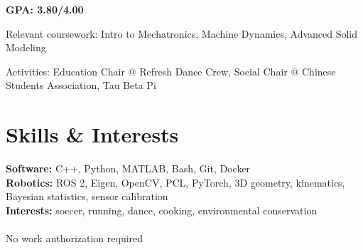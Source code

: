 \documentclass{resume}
\begin{document}
\begin{details}
\item \textbf{GPA: 3.80/4.00}
\item Relevant coursework: Intro to Mechatronics, Machine Dynamics, Advanced Solid Modeling
\item Activities: Education Chair @ Refresh Dance Crew, Social Chair @ Chinese Students
  Association, Tau Beta Pi
\end{details}

\section{Skills \& Interests}
\textbf{Software:} C++, Python, MATLAB, Bash, Git, Docker \\
\textbf{Robotics:} ROS 2, Eigen, OpenCV, PCL, PyTorch, 3D geometry, kinematics, Bayesian
statistics, sensor calibration \\
\textbf{Interests:} soccer, running, dance, cooking, environmental conservation \\~\\
\textsuperscript{\textasteriskcentered}No work authorization required
\end{document}
